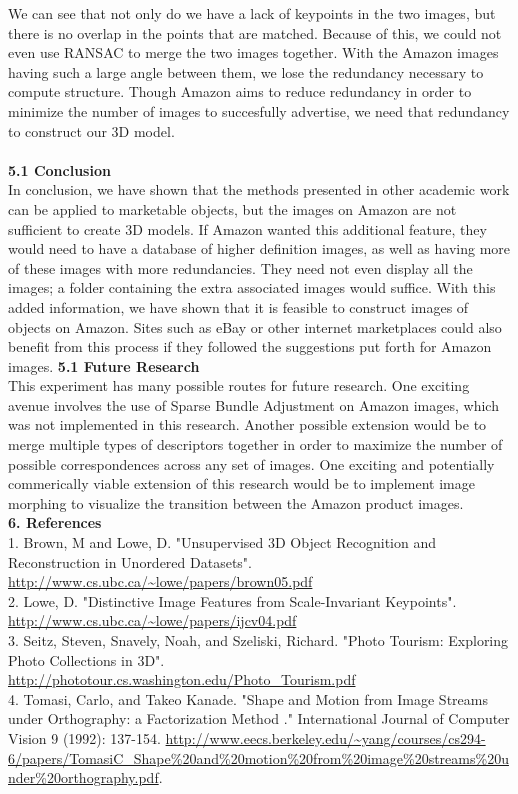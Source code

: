 \documentclass[12pt]{article}
\begin{document}
\begin{multicols}{2}
We can see that not only do we have a lack of keypoints in the two images, but there is no overlap in the points that are matched. Because of this, we could not even use RANSAC to merge the two images together. With the Amazon images having such a large angle between them, we lose the redundancy necessary to compute structure. Though Amazon aims to reduce redundancy in order to minimize the number of images to succesfully advertise, we need that redundancy to construct our 3D model.\\\\
{\large \textbf{5.1 Conclusion}}\\
In conclusion, we have shown that the methods presented in other academic work can be applied to marketable objects, but the images on Amazon are not sufficient to create 3D models. If Amazon wanted this additional feature, they would need to have a database of higher definition images, as well as having more of these images with more redundancies. They need not even display all the images; a folder containing the extra associated images would suffice. With this added information, we have shown that it is feasible to construct images of objects on Amazon. Sites such as eBay or other internet marketplaces could also benefit from this process if they followed the suggestions put forth for Amazon images. 
{\large \textbf{5.1 Future Research}}\\
This experiment has many possible routes for future research. One exciting avenue involves the use of Sparse Bundle Adjustment on Amazon images, which was not implemented in this research. Another possible extension would be to merge multiple types of descriptors together in order to maximize the number of possible correspondences across any set of images. One exciting and potentially commerically viable extension of this research would be to implement image morphing to visualize the transition between the Amazon product images. \\
{\large \textbf{6. References}}\\
1. Brown, M and Lowe, D. "Unsupervised 3D Object Recognition and Reconstruction in Unordered Datasets". \url{http://www.cs.ubc.ca/~lowe/papers/brown05.pdf}\\
2. Lowe, D. "Distinctive Image Features from Scale-Invariant Keypoints". \url{http://www.cs.ubc.ca/~lowe/papers/ijcv04.pdf} \\
3. Seitz, Steven, Snavely, Noah, and Szeliski, Richard. "Photo Tourism: Exploring Photo Collections in 3D". \url{http://phototour.cs.washington.edu/Photo_Tourism.pdf} \\
4. Tomasi, Carlo, and Takeo Kanade. "Shape and Motion from Image Streams under Orthography: a Factorization Method ." International Journal of Computer Vision 9 (1992): 137-154. \url{http://www.eecs.berkeley.edu/~yang/courses/cs294-6/papers/TomasiC_Shape\%20and\%20motion\%20from\%20image\%20streams\%20under\%20orthography.pdf}. \\

\end{multicols}
\end{document}
